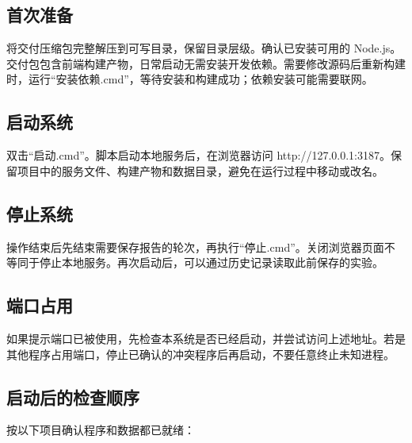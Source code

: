 \documentclass[UTF8,fontset=windows,zihao=-4]{ctexart}
\begin{document}
\subsection{首次准备}

将交付压缩包完整解压到可写目录，保留目录层级。确认已安装可用的 Node.js。交付包包含前端构建产物，日常启动无需安装开发依赖。需要修改源码后重新构建时，运行“安装依赖.cmd”，等待安装和构建成功；依赖安装可能需要联网。

\subsection{启动系统}

双击“启动.cmd”。脚本启动本地服务后，在浏览器访问 http://127.0.0.1:3187。保留项目中的服务文件、构建产物和数据目录，避免在运行过程中移动或改名。

\subsection{停止系统}

操作结束后先结束需要保存报告的轮次，再执行“停止.cmd”。关闭浏览器页面不等同于停止本地服务。再次启动后，可以通过历史记录读取此前保存的实验。

\subsection{端口占用}

如果提示端口已被使用，先检查本系统是否已经启动，并尝试访问上述地址。若是其他程序占用端口，停止已确认的冲突程序后再启动，不要任意终止未知进程。

\subsection{启动后的检查顺序}

按以下项目确认程序和数据都已就绪：
\end{document}
